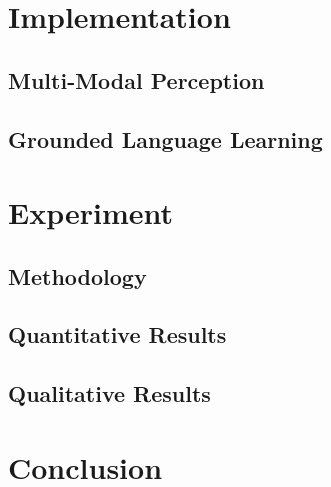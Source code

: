 \documentclass{article}
\begin{document}
\section{Implementation}
\label{sec:implementation}
	

	\subsection{Multi-Modal Perception}
	\label{ssec:mmp}
	

	\subsection{Grounded Language Learning}
	\label{ssec:gll}
	

\section{Experiment}
\label{sec:experiment}
	

	\subsection{Methodology}
	\label{ssec:methodology}
	

	\subsection{Quantitative Results}
	\label{ssec:results}
	

	\subsection{Qualitative Results}
	\label{ssec:qualitative}
	

\section{Conclusion}
\label{sec:conclusion}



\clearpage


\end{document}
